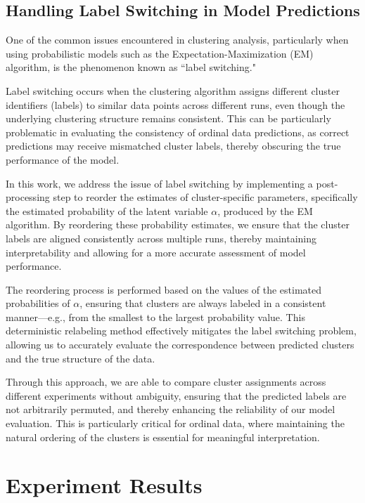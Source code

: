 \documentclass{article}
\begin{document}
\subsection{Handling Label Switching in Model Predictions}

One of the common issues encountered in clustering analysis, 
particularly when using probabilistic models such as the Expectation-Maximization (EM) algorithm, 
is the phenomenon known as ``label switching." 

Label switching occurs when the clustering algorithm assigns different cluster identifiers (labels) to similar data points across different runs, 
even though the underlying clustering structure remains consistent. 
This can be particularly problematic in evaluating the consistency of ordinal data predictions, 
as correct predictions may receive mismatched cluster labels, 
thereby obscuring the true performance of the model.

In this work, we address the issue of label switching by implementing a post-processing step to reorder the estimates of cluster-specific parameters, 
specifically the estimated probability of the latent variable 
$\alpha$, produced by the EM algorithm. By reordering these probability estimates, 
we ensure that the cluster labels are aligned consistently across multiple runs, 
thereby maintaining interpretability and allowing for a more accurate assessment of model performance.

The reordering process is performed based on the values of the estimated probabilities of 
$\alpha$, ensuring that clusters are always labeled in a consistent manner—e.g., 
from the smallest to the largest probability value. 
This deterministic relabeling method effectively mitigates the label switching problem, 
allowing us to accurately evaluate the correspondence between predicted clusters and the true structure of the data.

Through this approach, we are able to compare cluster assignments across different experiments without ambiguity, 
ensuring that the predicted labels are not arbitrarily permuted, and thereby enhancing the reliability of our model evaluation. 
This is particularly critical for ordinal data, where maintaining the natural ordering of the clusters is essential for meaningful interpretation.


\section{Experiment Results}
\end{document}
